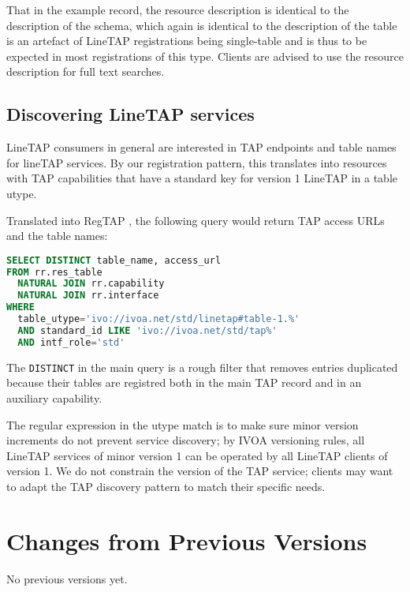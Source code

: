 \documentclass[11pt,a4paper]{ivoa}
\begin{document}
That in the example record, the resource description is identical to the
description of the schema, which again is identical to the description
of the table is an artefact of LineTAP registrations being single-table
and is thus to be expected in most registrations of this type.  Clients
are advised to use the resource description for full text searches.


\subsection{Discovering LineTAP services}

LineTAP consumers in general are interested in TAP endpoints and table names for
lineTAP services.  By our registration pattern, this translates into
resources with TAP capabilities that have a standard key for version 1
LineTAP in a table utype.

Translated into RegTAP \citep{2019ivoa.spec.1011D}, the following query
would return TAP access URLs and the table names:

\begin{lstlisting}[language=SQL]
SELECT DISTINCT table_name, access_url
FROM rr.res_table
  NATURAL JOIN rr.capability
  NATURAL JOIN rr.interface
WHERE
  table_utype='ivo://ivoa.net/std/linetap#table-1.%'
  AND standard_id LIKE 'ivo://ivoa.net/std/tap%'
  AND intf_role='std'
\end{lstlisting}

The \texttt{DISTINCT} in the main query is a rough filter that removes
entries duplicated because their tables are registred both in the main
TAP record and in an auxiliary capability.

The regular expression in the utype match is to make sure minor version
increments do not prevent service discovery; by IVOA versioning rules,
all LineTAP services of minor version 1 can be operated by all LineTAP
clients of version 1.  We do not constrain the version of the TAP
service; clients may want to adapt the TAP discovery pattern to match
their specific needs.



\appendix
\section{Changes from Previous Versions}

No previous versions yet.



\end{document}
